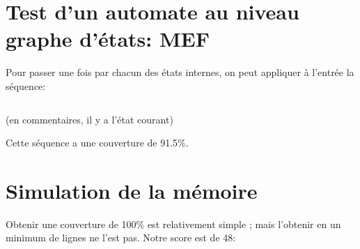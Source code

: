 \documentclass[11pt]{article}
\begin{document}
\section{Test d’un automate au niveau graphe d’états: MEF}

Pour passer une fois par chacun des états internes, on peut appliquer à l’entrée la séquence:
\inputminted[linenos]{verilog}{MEF.v}

(en commentaires, il y a l’état courant)

Cette séquence a une couverture de 91.5\%.

\section{Simulation de la mémoire}

Obtenir une couverture de 100\% est relativement simple ; mais l’obtenir en un minimum de lignes ne l’est pas.
Notre score est de 48:
\inputminted[linenos]{verilog}{ram100.v}
\end{document}
